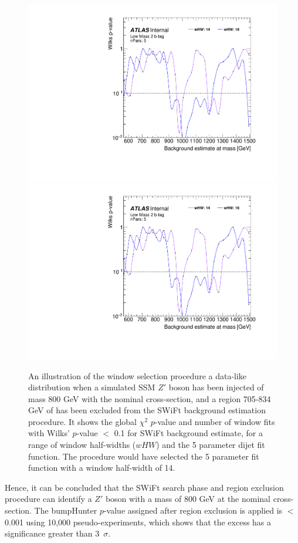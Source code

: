 \begin{figure}[!htb]
\captionsetup[subfigure]{aboveskip=0pt,justification=centering}
\centering
{} {
  \includegraphics[width=0.49\linewidth, angle=0,page=6]{figs/Dibjet/LowMass/FitStudy_min566/windowSel_corrFitCR_dataLike_v11_Zprimebb800_xsFactor1_removeWindow.pdf}
}\hspace{-8mm}
 {
  \includegraphics[width=0.49\linewidth, angle=0,page=8]{figs/Dibjet/LowMass/FitStudy_min566/windowSel_corrFitCR_dataLike_v11_Zprimebb800_xsFactor1_removeWindow.pdf}
}

\caption{\label{fig:windowSel_Zprimebb800_xsFactor1}
  An illustration of the window selection procedure a data-like distribution when
  a simulated SSM $Z'$ boson has been injected of mass 800 GeV with the nominal cross-section,
  and a region 705-834 GeV of has been excluded from the SWiFt background estimation procedure.
  It shows the global $\chi^{2}$ \mbox{$p$-value} %
  and number of window fits with Wilks' \mbox{$p$-value} $<$ 0.1 for SWiFt background estimate,
  for a range of window half-widths ($wHW$) and the 5 parameter dijet fit function.
  The procedure would have selected the 5 parameter fit function with a window half-width of 14.
}
\end{figure}

Hence, it can be concluded that the SWiFt search phase and region exclusion procedure can identify
a $Z'$ boson with a mass of 800 GeV at the nominal cross-section.
The bumpHunter $p$-value assigned after region exclusion is applied is $<$ 0.001 using 10,000 pseudo-experiments,
which shows that the excess has a significance greater than 3~$\sigma$.

